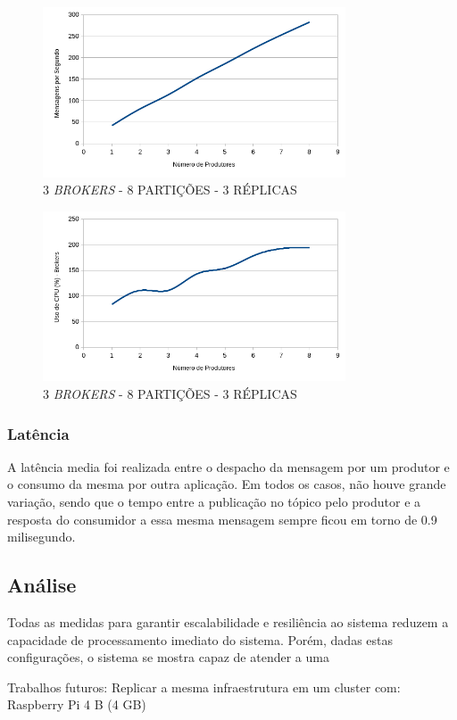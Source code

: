\documentclass[12pt]{article}
\begin{document}
\begin{figure}[ht]
    \centering
    \includegraphics[width=0.8\textwidth]{images/graficos/g4a.png}
    \caption{3 \textit{BROKERS} - 8 PARTIÇÕES - 3 RÉPLICAS}
    \label{fig:g4a}
\end{figure}

\begin{figure}[ht]
    \centering
    \includegraphics[width=0.8\textwidth]{images/graficos/g4b.png}
    \caption{3 \textit{BROKERS} - 8 PARTIÇÕES - 3 RÉPLICAS}
    \label{fig:g4b}
\end{figure}
\clearpage

\subsubsection{Latência}

A latência media foi realizada entre o despacho da mensagem por um produtor e o consumo da mesma por outra aplicação. Em todos os casos, não houve grande variação, sendo que o tempo entre a publicação no tópico pelo produtor e a resposta do consumidor a essa mesma mensagem sempre ficou em torno de 0.9 milisegundo.

\subsection{Análise}

Todas as medidas para garantir escalabilidade e resiliência ao sistema reduzem a capacidade de processamento imediato do sistema. Porém, dadas estas configurações, o sistema se mostra capaz de atender a uma 

Trabalhos futuros: Replicar a mesma infraestrutura em um cluster com: Raspberry Pi 4 B (4 GB)

\clearpage


\end{document}
